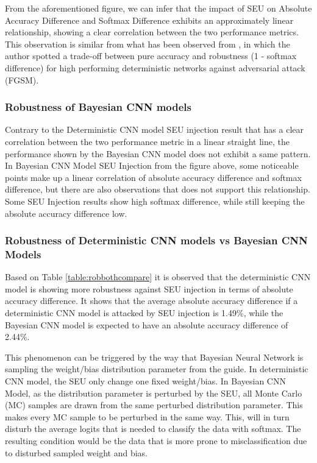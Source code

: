 \documentclass[ %
                    author={Revalda Putawara},
                supervisor={Dr. James Pope},
                    degree={MSc},
                     title={Robustness of Bayesian Neural Networks Design Choices Against Weight and Bias Perturbation Induced by Single Event Upsets (SEUs)},
                      type={},
                      year={2025}]{dissertation}
\begin{document}
From the aforementioned figure, we can infer that the impact of SEU on Absolute Accuracy Difference and Softmax Difference exhibits an approximately linear relationship, showing a clear correlation between the two performance metrics. This observation is similar from what has been observed from \cite{carbone2020a}, in which the author spotted a trade-off between pure accuracy and robustness (1 - softmax difference) for high performing deterministic networks against adversarial attack (FGSM).

\subsubsection{Robustness of Bayesian CNN models}

Contrary to the Deterministic CNN model SEU injection result that has a clear correlation between the two performance metric in a linear straight line, the performance shown by the Bayesian CNN model does not exhibit a same pattern. In Bayesian CNN Model SEU Injection from the figure above, some noticeable points make up a linear correlation of absolute accuracy difference and softmax difference, but there are also observations that does not support this relationship. Some SEU Injection results show high softmax difference, while still keeping the absolute accuracy difference low. 

\subsubsection{Robustness of Deterministic CNN models vs Bayesian CNN Models}


Based on Table \ref{table:robbothcompare} it is observed that the deterministic CNN model is showing more robustness against SEU injection in terms of absolute accuracy difference. It shows that the average absolute accuracy difference if a deterministic CNN model is attacked by SEU injection is 1.49\%, while the Bayesian CNN model is expected to have an absolute accuracy difference of 2.44\%. 

This phenomenon can be triggered by the way that Bayesian Neural Network is sampling the weight/bias distribution parameter from the guide. In deterministic CNN model, the SEU only change one fixed weight/bias. In Bayesian CNN Model, as the distribution parameter is perturbed by the SEU, all Monte Carlo (MC) samples are drawn from the same perturbed distribution parameter. This makes every MC sample to be perturbed in the same way. This, will in turn disturb the average logits that is needed to classify the data with softmax. The resulting condition would be the data that is more prone to misclassification due to disturbed sampled weight and bias.
\end{document}
